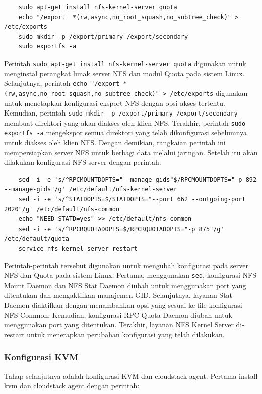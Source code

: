 \begin{listing}[H]
    \begin{verbatim}
    sudo apt-get install nfs-kernel-server quota
    echo "/export  *(rw,async,no_root_squash,no_subtree_check)" > /etc/exports
    sudo mkdir -p /export/primary /export/secondary
    sudo exportfs -a
    \end{verbatim}
\end{listing}

Perintah \texttt{sudo apt-get install nfs-kernel-server quota} digunakan untuk menginstal perangkat lunak server NFS dan modul Quota pada sistem Linux. Selanjutnya, perintah \texttt{echo "/export *(rw,async,no\_root\_squash,no\_subtree\_check)" > /etc/exports} digunakan untuk menetapkan konfigurasi eksport NFS dengan opsi akses tertentu. Kemudian, perintah \texttt{sudo mkdir -p /export/primary /export/secondary} membuat direktori yang akan diakses oleh klien NFS. Terakhir, perintah \texttt{sudo exportfs -a} mengekspor semua direktori yang telah dikonfigurasi sebelumnya untuk diakses oleh klien NFS. Dengan demikian, rangkaian perintah ini mempersiapkan server NFS untuk berbagi data melalui jaringan. Setelah itu akan dilakukan konfigurasi NFS server dengan perintah:

\begin{listing}[H]
    \begin{verbatim}
    sed -i -e 's/^RPCMOUNTDOPTS="--manage-gids"$/RPCMOUNTDOPTS="-p 892 --manage-gids"/g' /etc/default/nfs-kernel-server
    sed -i -e 's/^STATDOPTS=$/STATDOPTS="--port 662 --outgoing-port 2020"/g' /etc/default/nfs-common
    echo "NEED_STATD=yes" >> /etc/default/nfs-common
    sed -i -e 's/^RPCRQUOTADOPTS=$/RPCRQUOTADOPTS="-p 875"/g' /etc/default/quota
    service nfs-kernel-server restart
    \end{verbatim}
\end{listing}

Perintah-perintah tersebut digunakan untuk mengubah konfigurasi pada server NFS dan Quota pada sistem Linux. Pertama, menggunakan \texttt{sed}, konfigurasi NFS Mount Daemon dan NFS Stat Daemon diubah untuk menggunakan port yang ditentukan dan mengaktifkan manajemen GID. Selanjutnya, layanan Stat Daemon diaktifkan dengan menambahkan opsi yang sesuai ke file konfigurasi NFS Common. Kemudian, konfigurasi RPC Quota Daemon diubah untuk menggunakan port yang ditentukan. Terakhir, layanan NFS Kernel Server di-restart untuk menerapkan perubahan konfigurasi yang telah dilakukan.

\subsubsection{Konfigurasi KVM}
Tahap selanjutnya adalah konfigurasi KVM dan cloudstack agent. Pertama install kvm dan cloudstack agent dengan perintah:

